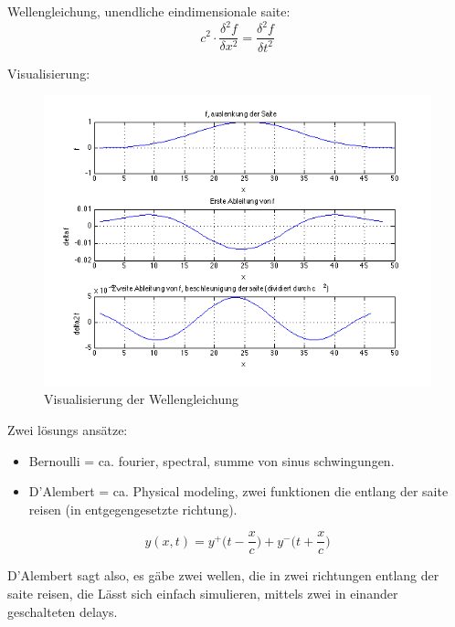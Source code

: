 Wellengleichung, unendliche eindimensionale saite:
\begin{equation}
	c^2 \cdot \frac{\delta^2 f}{\delta x^2} = \frac{\delta ^2 f}{\delta t ^2}
\end{equation}

Visualisierung:

\begin{figure}[H]
  \begin{center}
    \includegraphics[width = 14cm]{img/wellengleichung.png}
    \caption{Visualisierung der Wellengleichung}
    \label{fig:wellengleichung}
  \end{center}
\end{figure}




Zwei lösungs ansätze: 
\begin{itemize}
	\item Bernoulli = ca. fourier, spectral, summe von sinus schwingungen.
	\item D'Alembert = ca. Physical modeling, zwei funktionen die entlang der saite reisen (in entgegengesetzte richtung).
\end{itemize}


\begin{equation}
y(x, t) = y ^+ \Bigg(t - \frac{x}{c}\Bigg) + y^- \Bigg(t + \frac{x}{c} \Bigg)
\end{equation}

D'Alembert sagt also, es gäbe zwei wellen, die in zwei richtungen entlang der saite reisen, die Lässt sich einfach simulieren, mittels zwei in einander geschalteten delays.

